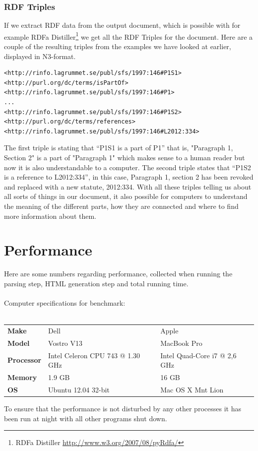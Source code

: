 \subsubsection{RDF Triples}
If we extract RDF data from the output document, which is possible with for example RDFa Distiller\footnote{RDFa Distiller \url{http://www.w3.org/2007/08/pyRdfa/}} we get all the RDF Triples for the document. Here are a couple of the resulting triples from the examples we have looked at earlier, displayed in N3-format.\cite{n3Bib}\\
\begin{verbatim}
<http://rinfo.lagrummet.se/publ/sfs/1997:146#P1S1> 
<http://purl.org/dc/terms/isPartOf>
<http://rinfo.lagrummet.se/publ/sfs/1997:146#P1>
...
<http://rinfo.lagrummet.se/publ/sfs/1997:146#P1S2>
<http://purl.org/dc/terms/references>
<http://rinfo.lagrummet.se/publ/sfs/1997:146#L2012:334>
\end{verbatim}
\linebreak
\newline
The first triple is stating that “P1S1 is a part of P1” that is, "Paragraph 1, Section 2" is a part of "Paragraph 1" which makes sense to a human reader but now it is also understandable to a computer. The second triple states that “P1S2 is a reference to L2012:334”, in this case, Paragraph 1, section 2 has been revoked and replaced with a new statute, 2012:334. With all these triples telling us about all sorts of things in our document, it also possible for computers to understand the meaning of the different parts, how they are connected and where to find more information about them.

\section{Performance}
Here are some numbers regarding performance, collected when running the parsing step, HTML generation step and total running time.\\\\
Computer specifications for benchmark:\\\\ 
\begin{tabular}{l l l}
\textbf{Make} & Dell & Apple\\
\textbf{Model} & Vostro V13 & MacBook Pro\\
\textbf{Processor} & Intel Celeron CPU 743 @ 1.30 GHz & Intel Quad-Core i7 @ 2,6 GHz \\
\textbf{Memory} & 1.9 GB & 16 GB\\
\textbf{OS} & Ubuntu 12.04 32-bit & Mac OS X Mnt Lion\\
\end{tabular}
\linebreak
\newline
To ensure that the performance is not disturbed by any other processes it has been run at night with all other programs shut down.
